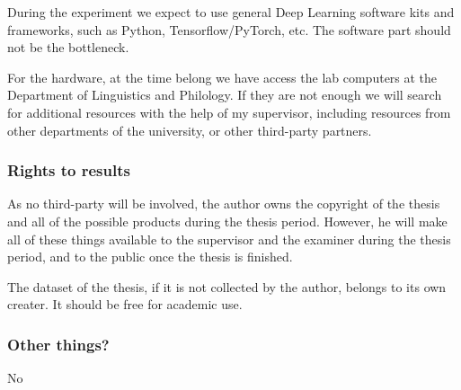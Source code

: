 \documentclass[a4paper,12pt]{article}
\begin{document}
During the experiment we expect to use general Deep Learning software kits and frameworks, such as Python, Tensorflow/PyTorch, etc. The software part should not be the bottleneck.

For the hardware, at the time belong we have access the lab computers at the Department of Linguistics and Philology. If they are not enough we will search for additional resources with the help of my supervisor, including resources from other departments of the university, or other third-party partners.

\subsubsection*{Rights to results}

As no third-party will be involved, the author owns the copyright of the thesis and all of the possible products during the thesis period. However, he will make all of these things available to the supervisor and the examiner during the thesis period, and to the public once the thesis is finished.

The dataset of the thesis, if it is not collected by the author, belongs to its own creater. It should be free for academic use.

\subsubsection*{Other things?}

No
\end{document}
